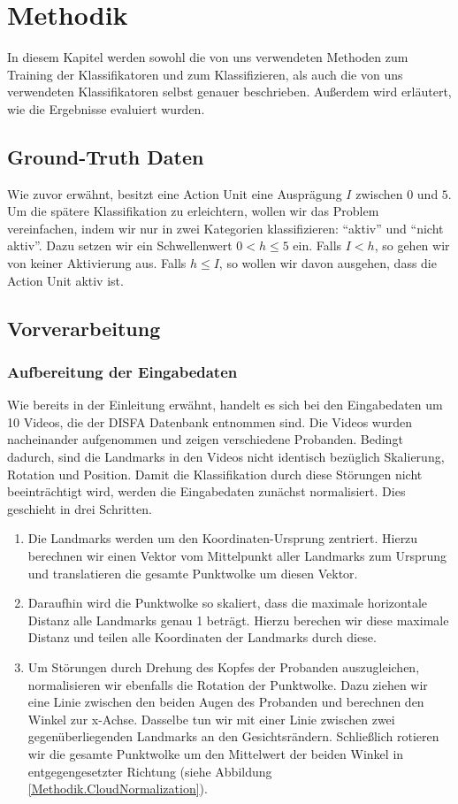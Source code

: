 \chapter{Methodik}\label{ch:methodik}
In diesem Kapitel werden sowohl die von uns verwendeten Methoden zum Training der Klassifikatoren und zum Klassifizieren,
als auch die von uns verwendeten Klassifikatoren selbst genauer beschrieben. Außerdem wird erläutert, wie die Ergebnisse
evaluiert wurden.

\section{Ground-Truth Daten}
Wie zuvor erwähnt, besitzt eine Action Unit eine Ausprägung $I$ zwischen $0$ und $5$. Um die spätere Klassifikation zu erleichtern, wollen wir das Problem vereinfachen, indem wir nur in zwei Kategorien klassifizieren: "`aktiv"' und "`nicht aktiv"'. Dazu setzen wir ein Schwellenwert $0<h\leq5$ ein. Falls $I<h$, so gehen wir von keiner Aktivierung aus. Falls $h\leq I$, so wollen wir davon ausgehen, dass die Action Unit aktiv ist.
\section{Vorverarbeitung}
\subsection{Aufbereitung der Eingabedaten}\label{Methodik.Aufbereitung}
Wie bereits in der Einleitung erwähnt, handelt es sich bei den Eingabedaten um 10 Videos, die der DISFA Datenbank entnommen sind.
Die Videos wurden nacheinander aufgenommen und zeigen verschiedene Probanden. Bedingt dadurch, sind die Landmarks
in den Videos nicht identisch bezüglich Skalierung, Rotation und Position.\newline
Damit die Klassifikation durch diese Störungen nicht beeinträchtigt wird, werden die Eingabedaten zunächst normalisiert. Dies geschieht
in drei Schritten.
\begin{enumerate}
  \item Die Landmarks werden um den Koordinaten-Ursprung zentriert. Hierzu berechnen wir einen Vektor vom Mittelpunkt aller Landmarks zum Ursprung und translatieren
        die gesamte Punktwolke um diesen Vektor.
  \item Daraufhin wird die Punktwolke so skaliert, dass die maximale horizontale Distanz alle Landmarks genau 1 beträgt. Hierzu berechen wir diese maximale Distanz und
        teilen alle Koordinaten der Landmarks durch diese.
  \item Um Störungen durch Drehung des Kopfes der Probanden auszugleichen,
    normalisieren wir ebenfalls die Rotation der Punktwolke. Dazu ziehen wir
    eine Linie
    zwischen den beiden Augen des Probanden und berechnen den Winkel zur
    x-Achse. Dasselbe tun wir mit einer Linie zwischen zwei gegenüberliegenden
    Landmarks an den Gesichtsrändern. Schließlich rotieren wir die gesamte
    Punktwolke um den Mittelwert der beiden Winkel in entgegengesetzter Richtung  (siehe Abbildung \ref{Methodik.CloudNormalization}).
\end{enumerate}


